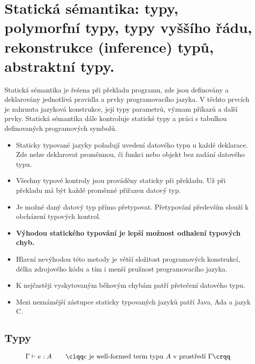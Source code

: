 \section[TPJ - Statická sémantika]{Statická sémantika: typy, polymorfní typy, typy vyššího řádu, rekonstrukce (inference) typů, abstraktní typy.}

Statická sémantika je řešena při překladu programu, zde jsou definovány a deklarovány jednotlivá pravidla a prvky programovacího jazyka. V těchto prvcích je zahrnuta jazyková konstrukce, její typy parametrů, význam příkazů a další prvky. Statická sémantika dále kontroluje statické typy a práci s tabulkou definovaných programových symbolů.

\begin{itemize}[itemsep=0px]
\item Staticky typované jazyky požadují uvedení datového typu u každé deklarace. Zde nelze deklarovat proměnnou, či funkci nebo objekt bez zadání datového typu.
\item Všechny typové kontroly jsou prováděny staticky při překladu. Už při překladu má být každé proměnné přiřazen datový typ.
\item Je možné daný datový typ přímo přetypovat. Přetypování především slouží k obcházení typových kontrol.
\item \textbf{Výhodou statického typování je lepší možnost odhalení typových chyb.}
\item Hlavní nevýhodou této metody je větší složitost programových konstrukcí, délka zdrojového kódu a tím i menší pružnost programovacího jazyka.
\item K nejčastěji vyskytovaným běhovým chybám patří přetečení datového typu.
\item Mezi neznámější zástupce staticky typovaných jazyků patří Java, Ada a jazyk C.
\end{itemize}

\subsection{Typy}

$$\Gamma \vdash e : A \qquad \text{\uv{$e$ je well-formed term typu $A$ v prostředí $\Gamma$}}$$

